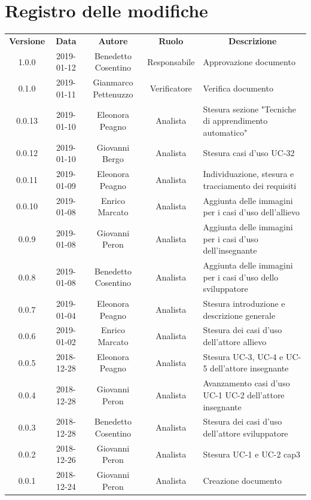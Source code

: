 \documentclass[11pt,a4paper]{article}
\begin{document}
	
	
	\newpage
	\section*{\centering Registro delle modifiche}
	\begin{tabularx}{\textwidth}{  c | c | c | c | X }
		\rowcolor{LightBlue}
		\color{white}\bfseries Versione & \color{white}\bfseries Data & \color{white}\bfseries Autore & \color{white}\bfseries Ruolo & \multicolumn{1}{c}{\color{white}\bfseries Descrizione}\\[0.25cm]
		1.0.0 & 2019-01-12 & Benedetto Cosentino & Responsabile & Approvazione documento \\ \hline
		0.1.0 & 2019-01-11 & Gianmarco Pettenuzzo & Verificatore & Verifica documento \\ \hline
		0.0.13 & 2019-01-10 & Eleonora Peagno & Analista & Stesura sezione "Tecniche di apprendimento automatico" \\ \hline
		0.0.12 & 2019-01-10 & Giovanni Bergo & Analista & Stesura casi d'uso UC-32 \\ \hline
		0.0.11 & 2019-01-09 & Eleonora Peagno & Analista & Individuazione, stesura e tracciamento dei requisiti \\ \hline
		0.0.10 & 2019-01-08 & Enrico Marcato & Analista & Aggiunta delle immagini per i casi d'uso dell'allievo\\ \hline
		0.0.9 & 2019-01-08 & Giovanni Peron & Analista & Aggiunta delle immagini per i casi d'uso dell'insegnante\\ \hline
		0.0.8 & 2019-01-08 & Benedetto Cosentino & Analista & Aggiunta delle immagini per i casi d'uso dello sviluppatore\\ \hline
		0.0.7 & 2019-01-04 & Eleonora Peagno & Analista & Stesura introduzione e descrizione generale\\ \hline
		0.0.6 & 2019-01-02 & Enrico Marcato & Analista & Stesura dei casi d'uso dell'attore allievo\\ \hline
		0.0.5 & 2018-12-28 & Eleonora Peagno & Analista & Stesura UC-3, UC-4 e UC-5 dell'attore insegnante\\ \hline
		0.0.4 & 2018-12-28 & Giovanni Peron & Analista & Avanzamento casi d'uso UC-1 UC-2 dell'attore insegnante\\ \hline
		0.0.3 & 2018-12-28 & Benedetto Cosentino & Analista & Stesura dei casi d'uso dell'attore sviluppatore\\ \hline
		0.0.2 & 2018-12-26 & Giovanni Peron & Analista & Stesura UC-1 e UC-2 cap3\\ \hline
		0.0.1 & 2018-12-24 & Giovanni Peron & Analista & Creazione documento\\ \hline
	\end{tabularx}
	\newpage
	\tableofcontents
	\listoffigures
	\listoftables
	\newpage	
\end{document}

